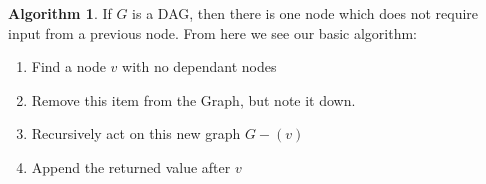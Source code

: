 \documentclass{report}
\theoremstyle{definition}
\newtheorem*{alg}{Algorithm}
\begin{document}
			\begin{alg}
				If $G$ is a DAG, then there is one node which does not require input from a previous node. From here we see
				our basic algorithm:
				\begin{enumerate}
					\item Find a node $v$ with no dependant nodes
					\item Remove this item from the Graph, but note it down.
					\item Recursively act on this new graph $G-(v)$
					\item Append the returned value after $v$
				\end{enumerate}
			\end{alg}
\end{document}
